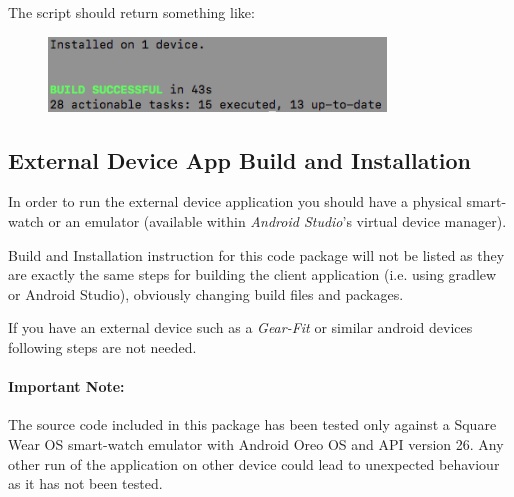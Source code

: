 \documentclass[a4paper]{article}
\begin{document}
The script should return something like:
\begin{figure}[!htpb]
    \centering
    \includegraphics[width=0.8\textwidth, keepaspectratio]{ITD/images/gradle.png}
\end{figure}

\newpage
\subsection{External Device App Build and Installation}

In order to run the external device application you should have a physical smart-watch or an emulator (available within \textit{Android Studio}'s virtual device manager).

Build and Installation instruction for this code package will not be listed as they are exactly the same steps for building the client application (i.e. using gradlew or Android Studio), obviously changing build files and packages.

If you have an external device such as a \textit{Gear-Fit} or similar android devices following steps are not needed.

\paragraph{Important Note:}
The source code included in this package has been tested only against a Square Wear OS smart-watch emulator with Android Oreo OS and API version 26. Any other run of the application on other device could lead to unexpected behaviour as it has not been tested.
\end{document}
